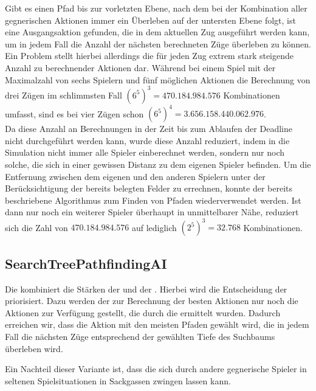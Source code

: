 Gibt es einen Pfad bis zur vorletzten Ebene, nach dem bei der Kombination aller gegnerischen Aktionen immer ein
Überleben auf der untersten Ebene folgt, ist eine Ausgangsaktion gefunden, die in dem aktuellen Zug ausgeführt werden
kann, um in jedem Fall die Anzahl der nächsten berechneten Züge überleben zu können. \\

Ein Problem stellt hierbei allerdings die für jeden Zug extrem stark steigende Anzahl zu berechnender Aktionen dar.
Während bei einem Spiel mit der Maximalzahl von sechs Spielern und fünf möglichen Aktionen die Berechnung von drei Zügen
im schlimmsten Fall $(6 ^ 5) ^ 3 = 470.184.984.576$ Kombinationen umfasst, sind es bei vier Zügen schon
$(6 ^ 5) ^ 4 = 3.656.158.440.062.976$. \\

Da diese Anzahl an Berechnungen in der Zeit bis zum Ablaufen der Deadline nicht durchgeführt werden kann, wurde diese
Anzahl reduziert, indem in die Simulation nicht immer alle Spieler einberechnet werden, sondern nur noch solche,
die sich in einer gewissen Distanz zu dem eigenen Spieler befinden.
Um die Entfernung zwischen dem eigenen und den anderen Spielern unter der Berücksichtigung der bereits belegten Felder
zu errechnen, konnte der bereits beschriebene Algorithmus zum Finden von Pfaden wiederverwendet werden.
Ist dann \bspw nur noch ein weiterer Spieler überhaupt in unmittelbarer Nähe, reduziert sich die Zahl von
$470.184.984.576$ auf lediglich $(2 ^ 5) ^ 3 = 32.768$ Kombinationen.

\subsection{SearchTreePathfindingAI}
\label{subsec:searchtree-pathfinding-ai}

Die  kombiniert die Stärken der  und der .
Hierbei wird die Entscheidung der  priorisiert.
Dazu werden der  zur Berechnung der besten Aktionen nur noch die Aktionen zur Verfügung gestellt, die
durch die  ermittelt wurden.
Dadurch erreichen wir, dass die Aktion mit den meisten Pfaden gewählt wird, die in jedem Fall die nächsten Züge
entsprechend der gewählten Tiefe des Suchbaums überleben wird.

Ein Nachteil dieser Variante ist, dass die  sich durch andere gegnerische Spieler in
seltenen Spielsituationen in Sackgassen zwingen lassen kann.

